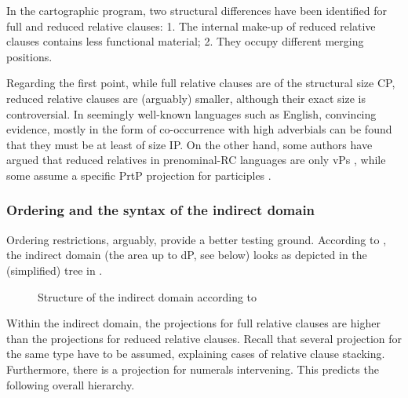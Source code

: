 In the cartographic program, two structural differences have been identified for full and reduced relative clauses: 1. The internal make-up of reduced relative clauses contains less functional material; 2. They occupy different merging positions.

Regarding the first point, while full relative clauses are of the structural size CP, reduced relative clauses are (arguably) smaller, although their exact size is controversial. In seemingly well-known languages such as English, convincing evidence, mostly in the form of co-occurrence with high adverbials \citep{douglas:2016:syntactic, harwood:2018:rrc, cinque:2020:relcl} can be found that they must be at least of size IP. On the other hand, some authors have argued that reduced relatives in prenominal-RC languages are only vPs \citep{krause:2001:rrc}, while some assume a specific PrtP projection for participles \citep{bhatt:1999:covert}.

\subsubsection{Ordering and the syntax of the indirect domain}

Ordering restrictions, arguably, provide a better testing ground. According to \citet{cinque:2010:adj, cinque:2020:relcl}, the indirect domain (the area up to dP, see below) looks as depicted in the (simplified) tree in .

\begin{figure}
\centering
\caption{Structure of the indirect domain according to \citet{cinque:2010:adj, cinque:2020:relcl}}
\label{Indirect domain Cinque}
\end{figure}

Within the indirect domain, the projections for full relative clauses are higher than the projections for reduced relative clauses. Recall that several projection for the same type have to be assumed, explaining cases of relative clause stacking. Furthermore, there is a projection for numerals intervening. This predicts the following overall hierarchy.

